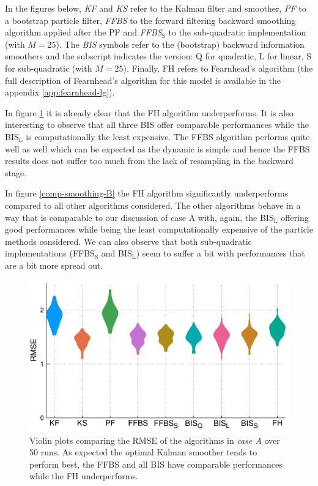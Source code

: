 In the figures below, \emph{KF} and \emph{KS} refer to the Kalman filter and smoother, \emph{PF} to a bootstrap particle filter, \emph{FFBS} to the forward filtering backward smoothing algorithm applied after the PF and \emph{FFBS$_{\text{S}}$} to the sub-quadratic implementation (with $M=25$). The \emph{BIS} symbols refer to the (bootstrap) backward information smoothers and the subscript indicates the version: Q for quadratic, L for linear, S for sub-quadratic (with $M=25$). Finally, FH refers to Fearnhead's algorithm (the full description of Fearnhead's algorithm for this model is available in the appendix \ref{app:fearnhead-lg}).

In figure \ref{comp-smoothing-A} it is already clear that the FH algorithm underperforms. It is also interesting to observe that all three BIS offer comparable performances while the BIS$_{\text{L}}$ is computationally the least expensive.
The FFBS algorithm performs quite well as well which can be expected as the dynamic is simple and hence the FFBS results does not suffer too much from the lack of resampling in the backward stage.

In figure \ref{comp-smoothing-B} the FH algorithm significantly underperforms compared to all other algorithms considered. The other algorithms behave in a way that is comparable to our discussion of case A with, again, the BIS$_{\text{L}}$ offering good performances while being the least computationally expensive of the particle methods considered. 
We can also observe that both sub-quadratic implementations (FFBS$_{\text{S}}$ and BIS$_{\text{L}}$) seem to suffer a bit with performances that are a bit more spread out. 


\begin{figure}[!h]
\center
\includegraphics[width=.65\textwidth]{figures/tfs/comparison_caseA}
\caption{\label{comp-smoothing-A}Violin plots comparing the RMSE of the algorithms in \emph{case A} over 50 runs. As expected the optimal Kalman smoother tends to perform best, the FFBS and all BIS have comparable performances while the FH underperforms.}
\end{figure}

